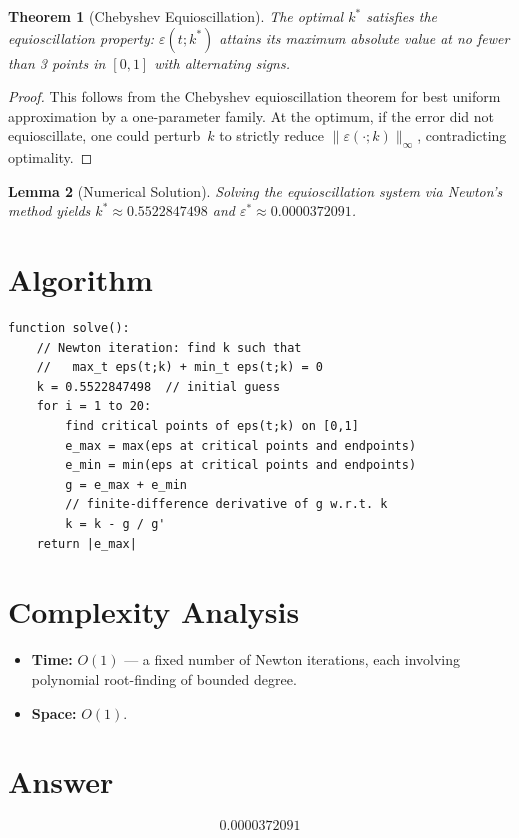 \documentclass[11pt]{article}
\newtheorem{theorem}{Theorem}
\newtheorem{lemma}[theorem]{Lemma}
\begin{document}
\begin{theorem}[Chebyshev Equioscillation]
The optimal $k^*$ satisfies the equioscillation property: $\varepsilon(t; k^*)$ attains its maximum absolute value at no fewer than 3 points in $[0,1]$ with alternating signs.
\end{theorem}

\begin{proof}
This follows from the Chebyshev equioscillation theorem for best uniform approximation by a one-parameter family. At the optimum, if the error did not equioscillate, one could perturb~$k$ to strictly reduce $\|\varepsilon(\cdot;k)\|_\infty$, contradicting optimality.
\end{proof}

\begin{lemma}[Numerical Solution]
Solving the equioscillation system via Newton's method yields $k^* \approx 0.5522847498$ and $\varepsilon^* \approx 0.0000372091$.
\end{lemma}

\section{Algorithm}

\begin{verbatim}
function solve():
    // Newton iteration: find k such that
    //   max_t eps(t;k) + min_t eps(t;k) = 0
    k = 0.5522847498  // initial guess
    for i = 1 to 20:
        find critical points of eps(t;k) on [0,1]
        e_max = max(eps at critical points and endpoints)
        e_min = min(eps at critical points and endpoints)
        g = e_max + e_min
        // finite-difference derivative of g w.r.t. k
        k = k - g / g'
    return |e_max|
\end{verbatim}

\section{Complexity Analysis}

\begin{itemize}
\item \textbf{Time:} $O(1)$ --- a fixed number of Newton iterations, each involving polynomial root-finding of bounded degree.
\item \textbf{Space:} $O(1)$.
\end{itemize}

\section{Answer}

\[
\boxed{0.0000372091}
\]
\end{document}
